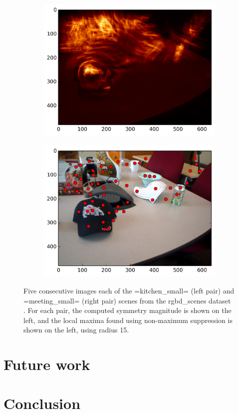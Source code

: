 \begin{figure}[ht]
\begin{subfigure}[]{0.25\linewidth}\label{fig:meet_smag_4}\includegraphics[width=\linewidth]{figures/meeting_smag_9}\end{subfigure}%
\begin{subfigure}[]{0.25\linewidth}\label{fig:meet_feats_4}\includegraphics[width=\linewidth]{figures/meeting_feats_9}\end{subfigure}
\caption{Five consecutive images each of the =kitchen\_small= (left pair) and =meeting\_small= (right pair) scenes from the rgbd\_scenes dataset \cite{Henry2012}. For each pair, the computed symmetry magnitude is shown on the left, and the local maxima found using non-maximum suppression is shown on the left, using radius 15.}
\label{fig:ex_xforms}
\end{figure}

\section{Future work}
\label{sec:future}

\section{Conclusion}
\label{sec:conclusion}



